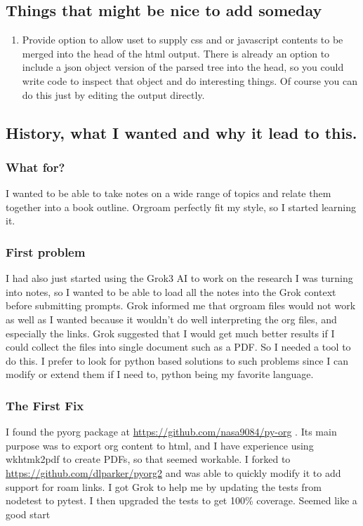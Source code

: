 \documentclass[11pt]{article}
\begin{document}
\subsection{Things that might be nice to add someday  }
 \label{obj-145}
 \label{obj-144}
\begin{enumerate}
\item
Provide option to allow uset to supply css and or javascript contents to
  be merged into the head of the html output. There is already an option
  to include a json object version of the parsed tree into the head, so
  you could write code to inspect that object and do interesting things.
  Of course you can do this just by editing the output directly.

\end{enumerate}
\subsection{History, what I wanted and why it lead to this.  }
 \label{obj-156}
 \label{obj-155}
\subsubsection{What for?  }
 \label{obj-159}
 \label{obj-158}
  I wanted to be able to take notes on a wide range of topics and relate them together
  into a book outline. Orgroam perfectly fit my style, so I started learning it.

\subsubsection{First problem  }
 \label{obj-165}
 \label{obj-164}
  I had also just started using the Grok3 AI to work on the research I was turning into notes,
  so I wanted to be able to load all the notes into the Grok context before submitting
  prompts. Grok informed me that orgroam files would not work as well as I wanted because
  it wouldn't do well interpreting the org files, and especially the links. Grok suggested
  that I would get much better results if I could collect the files into single document
  such as a PDF. So I needed a tool to do this. I prefer to look for python based solutions
  to such problems since I can modify or extend them if I need to, python being my favorite
  language.

\subsubsection{The First Fix  }
 \label{obj-177}
 \label{obj-176}
I found the pyorg package at
\href{https://github.com/nasa9084/py-org}{https://github.com/nasa9084/py-org}
.
  Its main purpose was to export org content to html, and I have experience using
  wkhtmk2pdf to create PDFs, so that seemed workable. I forked to
\href{https://github.com/dlparker/pyorg2}{https://github.com/dlparker/pyorg2}
and was able to quickly modify it to add support
  for roam links.
  I got Grok to help me by updating the tests from nodetest to pytest.
  I then upgraded the tests to get 100\% coverage. Seemed like a good start
\end{document}
